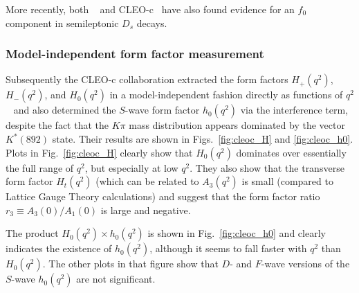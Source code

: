 More recently, both \babar~\cite{Aubert:2008rs} and 
CLEO-c~\cite{Ecklund:2009fia} have also found evidence 
for an $f^{}_0$ component in semileptonic $D^{}_s$ decays.



\subsubsection{Model-independent form factor measurement}

Subsequently the CLEO-c collaboration extracted the form factors
$H_+(q^2)$, $H_-(q^2)$, and $H_0(q^2)$ in a model-independent fashion
directly as functions of $q^2$~\cite{Briere:2010zc} and also determined the
$S$-wave form factor $h_0(q^2)$ via the interference term, despite the
fact that the $K\pi$ mass distribution appears dominated by the vector
$K^*(892)$ state. Their results are shown in Figs.~\ref{fig:cleoc_H} and
\ref{fig:cleoc_h0}.  Plots in Fig.~\ref{fig:cleoc_H} clearly show that
$H_0(q^2)$ dominates over essentially the full range of $q^2$, but
especially at low $q^2$. They also show that the transverse form factor
$H_t(q^2)$ (which can be related to $A_3(q^2)$ is small (compared to
Lattice Gauge Theory calculations) and suggest that the form factor
ratio $r_3 \equiv A_3(0) / A_1(0)$ is large and negative.

The product $H_0(q^2)\times h_0(q^2)$ is shown in
Fig.~\ref{fig:cleoc_h0} and clearly indicates the existence of
$h_0(q^2)$, although it seems to fall faster with $q^2$ than $H_0(q^2)$.
The other plots in that figure show that $D$- and $F$-wave versions of
the $S$-wave $h_0(q^2)$ are not significant.

